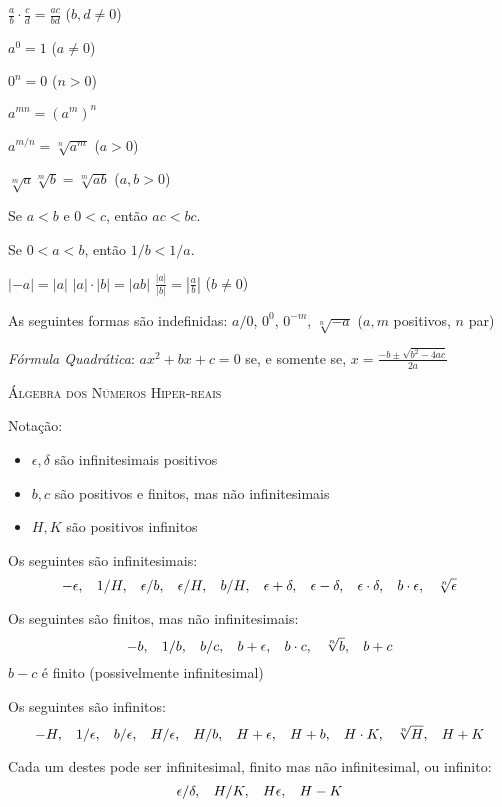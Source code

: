 \documentclass{svmono}
\begin{document}
\begin{multicols}{2}
$\displaystyle \frac{a}{b} \cdot \frac{c}{d} = \frac{ac}{bd}$ ($b,d \ne 0$)

$\displaystyle a^0 = 1$ ($a \ne 0$)

$\displaystyle 0^n = 0$ ($n > 0$)

$\displaystyle a^{mn} = \left(a^m\right)^n$

$\displaystyle a^{m/n} = \sqrt[n]{a^m}$ ($a > 0$)

$\displaystyle \sqrt[m]{a} \sqrt[m]{b} = \sqrt[m]{ab}$ ($a,b > 0$)

Se $a < b$ e $0 < c$, então $ac < bc$.

Se $0 < a < b$, então $1/b < 1/a$.
\end{multicols}

$|-a| = |a|$ \hspace{4ex} $|a|\cdot|b| = |ab|$ \hspace{4ex}
$\displaystyle \frac{|a|}{|b|} = \left| \frac{a}{b} \right|$ ($b \ne 0$)

As seguintes formas são indefinidas:
$a/0$, $0^0$, $0^{-m}$, $\sqrt[n]{-a}$ ($a,m$ positivos, $n$ par)

\emph{Fórmula Quadrática}: $\displaystyle a x^2 + b x + c = 0$ se, e somente se,
$\displaystyle x = \frac{-b \pm \sqrt{b^2 - 4ac}}{2a}$


\textsc{Álgebra dos Números Hiper-reais}

Notação:
\begin{itemize}
\item $\epsilon, \delta$ são infinitesimais positivos
\item $b,c$ são positivos e finitos, mas não infinitesimais
\item $H,K$ são positivos infinitos
\end{itemize}

Os seguintes são infinitesimais:
\[
 -\epsilon, \hspace{2ex}  1/H, \hspace{2ex}  \epsilon/b, \hspace{2ex}  \epsilon/H, \hspace{2ex}  b/H, \hspace{2ex}  \epsilon + \delta, \hspace{2ex}  \epsilon - \delta, \hspace{2ex}  \epsilon \cdot \delta, \hspace{2ex}  b \cdot \epsilon, \hspace{2ex}  \sqrt[n]{\epsilon}
\]

Os seguintes são finitos, mas não infinitesimais:
\[
 -b, \hspace{2ex} 1/b, \hspace{2ex} b/c, \hspace{2ex} b + \epsilon, \hspace{2ex} b \cdot c, \hspace{2ex} \sqrt[n]{b},
 \hspace{2ex} b+c
\]
$b-c$ é finito (possivelmente infinitesimal)

Os seguintes são infinitos:
\[
 -H, \hspace{2ex}  1/\epsilon, \hspace{2ex}  b/\epsilon, \hspace{2ex}  H/\epsilon, \hspace{2ex}  H/b, \hspace{2ex}  H+\epsilon, \hspace{2ex}  H+b, \hspace{2ex}  H\cdot K, \hspace{2ex}  \sqrt[n]{H}, \hspace{2ex}  H+K
\]

Cada um destes pode ser infinitesimal, finito mas não infinitesimal,
ou infinito:
\[
 \epsilon/\delta, \hspace{2ex} H/K, \hspace{2ex} H\epsilon, \hspace{2ex} H - K
\]
\end{document}
